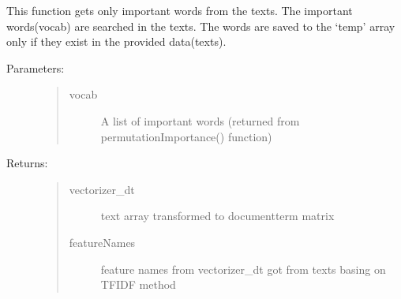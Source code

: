\documentclass[letterpaper,10pt,english]{sphinxmanual}
\begin{document}
\begin{fulllineitems}
\label{\detokenize{func:func.get_important}}
\pysigstartsignatures
{}
\pysigstopsignatures
\sphinxAtStartPar
This function gets only important words from the texts.
The important words(vocab) are searched in the texts.
The words are saved to the ‘temp’ array only if they exist in the provided data(texts).
\begin{description}
\item[{Parameters:}] \leavevmode\begin{quote}\begin{description}
\item[{vocab}] \leavevmode
\sphinxAtStartPar
A list of important words (returned from permutationImportance() function)

\end{description}\end{quote}

\item[{Returns:}] \leavevmode\begin{quote}\begin{description}
\item[{vectorizer\_dt}] \leavevmode
\sphinxAtStartPar
text array transformed to document\sphinxhyphen{}term matrix

\item[{featureNames}] \leavevmode
\sphinxAtStartPar
feature names from vectorizer\_dt got from texts basing on TF\sphinxhyphen{}IDF method

\end{description}\end{quote}

\end{description}

\end{fulllineitems}

\end{document}
